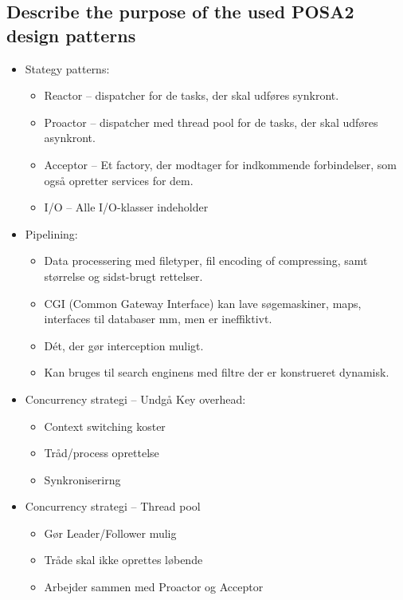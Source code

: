 \documentclass{article}
\begin{document}
\subsection{Describe the purpose of the used POSA2 design patterns}
\begin{itemize}
	\item Stategy patterns:
	\begin{itemize}
		\item Reactor -- dispatcher for de tasks, der skal udføres synkront.
		\item Proactor -- dispatcher med thread pool for de tasks, der skal udføres asynkront.
		\item Acceptor -- Et factory, der modtager for indkommende forbindelser, som også opretter services for dem.
		\item I/O -- Alle I/O-klasser indeholder 
	\end{itemize}

	\item Pipelining:
	\begin{itemize}
		\item Data processering med filetyper, fil encoding of compressing, samt størrelse og sidst-brugt rettelser.
		\item CGI (Common Gateway Interface) kan lave søgemaskiner, maps, interfaces til databaser mm, men er ineffiktivt.
		\item Dét, der gør interception muligt.
		\item Kan bruges til search enginens med filtre der er konstrueret dynamisk.
	\end{itemize}

	\item Concurrency strategi -- Undgå Key overhead:
	\begin{itemize}
		\item Context switching koster
		\item Tråd/process oprettelse
		\item Synkroniserirng
	\end{itemize}

	\item Concurrency strategi -- Thread pool
	\begin{itemize}
		\item Gør Leader/Follower mulig
		\item Tråde skal ikke oprettes løbende
		\item Arbejder sammen med Proactor og Acceptor
	\end{itemize}

\end{itemize}
\end{document}
